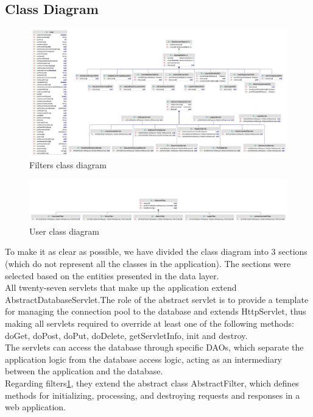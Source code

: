 \subsection{Class Diagram}

\begin{figure}[H]
    \centering
    \includegraphics[width=1\textwidth]{images/class1.jpg}
    \caption{Filters class diagram}
    \label{fig:filters}
\end{figure}

\begin{figure}[H]
    \centering
    \includegraphics[width=1\textwidth]{images/class2.jpg}
    \caption{User class diagram}
    \label{fig:user class diagram}
\end{figure}

To make it as clear as possible, we have divided the class diagram into 3 sections (which do not represent all the classes in the application). The sections were selected based on the entities presented in the data layer.\\
All twenty-seven servlets that make up the application extend AbstractDatabaseServlet.The role of the abstract servlet is to provide a template for managing the connection pool to the database and extends HttpServlet, thus making all servlets required to override at least one of the following methods: doGet, doPost, doPut, doDelete, getServletInfo, init and destroy.\\
The servlets can access the database through specific DAOs, which separate the application logic from the database access logic, acting as an intermediary between the application and the database.\\
Regarding filters\ref{fig:filters}, they extend the abstract class AbstractFilter, which defines methods for initializing, processing, and destroying requests and responses in a web application.